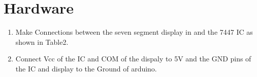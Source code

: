 \documentclass{article}
\begin{document}
\section{Hardware}
		\begin{enumerate}
			\item Make Connections between the seven segment display in and the 7447 IC as shown in Table2.


\begin{table}[h]
\centering

\label{table:2}

\end{table}
			\item Connect Vcc of the IC and COM of the dispaly to 5V and the GND pins of the IC and display to the Ground of arduino.
		\end{enumerate}
\end{document}
